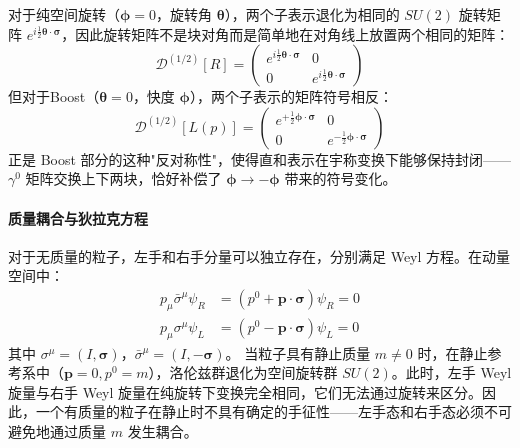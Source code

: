 对于纯空间旋转（$\boldsymbol{\phi} = 0$，旋转角 $\boldsymbol{\theta}$），两个子表示退化为相同的 $SU(2)$ 旋转矩阵 $e^{i\frac{1}{2}\boldsymbol{\theta}\cdot\boldsymbol{\sigma}}$，因此旋转矩阵不是块对角而是简单地在对角线上放置两个相同的矩阵：
\begin{equation}
    \mathscr{D}^{(1/2)}[R] = \begin{pmatrix} e^{i\frac{1}{2}\boldsymbol{\theta}\cdot\boldsymbol{\sigma}} & 0 \\ 0 & e^{i\frac{1}{2}\boldsymbol{\theta}\cdot\boldsymbol{\sigma}} \end{pmatrix}
\end{equation}
但对于Boost（$\boldsymbol{\theta} = 0$，快度 $\boldsymbol{\phi}$），两个子表示的矩阵符号相反：
\begin{equation}
    \mathscr{D}^{(1/2)}[L(p)] = \begin{pmatrix} e^{+\frac{1}{2}\boldsymbol{\phi}\cdot\boldsymbol{\sigma}} & 0 \\ 0 & e^{-\frac{1}{2}\boldsymbol{\phi}\cdot\boldsymbol{\sigma}} \end{pmatrix}
\end{equation}
正是 Boost 部分的这种"反对称性"，使得直和表示在宇称变换下能够保持封闭——$\gamma^0$ 矩阵交换上下两块，恰好补偿了 $\boldsymbol{\phi} \to -\boldsymbol{\phi}$ 带来的符号变化。

\paragraph{质量耦合与狄拉克方程}
对于无质量的粒子，左手和右手分量可以独立存在，分别满足 Weyl 方程。在动量空间中：
\begin{align}
    p_\mu \bar{\sigma}^\mu \psi_R &= (p^0 + \boldsymbol{p}\cdot\boldsymbol{\sigma}) \psi_R = 0 \\
    p_\mu \sigma^\mu \psi_L &= (p^0 - \boldsymbol{p}\cdot\boldsymbol{\sigma}) \psi_L = 0
\end{align}
其中 $\sigma^\mu = (I, \boldsymbol{\sigma})$，$\bar{\sigma}^\mu = (I, -\boldsymbol{\sigma})$。
当粒子具有静止质量 $m \neq 0$ 时，在静止参考系中（$\boldsymbol{p}=0, p^0=m$），洛伦兹群退化为空间旋转群 $SU(2)$。此时，左手 Weyl 旋量与右手 Weyl 旋量在纯旋转下变换完全相同，它们无法通过旋转来区分。因此，一个有质量的粒子在静止时不具有确定的手征性——左手态和右手态必须不可避免地通过质量 $m$ 发生耦合。

